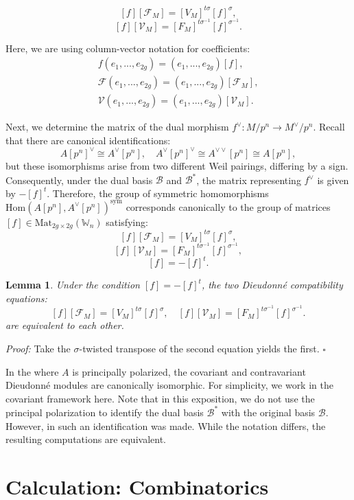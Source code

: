 \documentclass[a4paper,12pt,twoside]{report}
\newtheorem{lemma}[theorem]{Lemma}
\newcommand{\Hom}{\mathrm{Hom}}
\newcommand{\W}{\mathbb{W}}
\newcommand{\sym}{\mathrm{sym}}
\begin{document}
\[[f][\mathcal{F}_M]=[V_M]^{t\sigma}[f]^\sigma,\]
\[[f][\mathcal{V}_M]=[F_M]^{t\sigma^{-1}}[f]^{\sigma^{-1}}.\]

Here, we are using column-vector notation for coefficients: 
\[\begin{aligned}
    f(e_1,...,e_{2g})=(e_1,...,e_{2g})[f],\\
    \mathcal{F}(e_1,...,e_{2g})=(e_1,...,e_{2g})[\mathcal{F}_M],\\
    \mathcal{V}(e_1,...,e_{2g})=(e_1,...,e_{2g})[\mathcal{V}_M].
\end{aligned}\]

Next, we determine the matrix of the dual morphism $f^{\vee}: M/p^n\rightarrow M^{\vee}/p^n$. 
Recall that there are canonical identifications: 
\[A[p^n]^{\vee}\cong A^\vee[p^n],\quad A^\vee[p^n]^\vee\cong A^{\vee\vee}[p^n]\cong A[p^n],\]
but these isomorphisms arise from two different Weil pairings, differing by a sign. 
Consequently, under the dual basis $\mathcal{B}$ and $\mathcal{B}^*$, 
the matrix representing $f^\vee$ is given by $-[f]^t$. 
Therefore, the group of symmetric homomorphisms $\Hom(A[p^n],A^{\vee}[p^n])^{\sym}$ corresponds canonically to
the group of matrices $[f]\in \mathrm{Mat}_{2g\times 2g}(\W_{n})$ satisfying:  
\[[f][\mathcal{F}_M]=[V_M]^{t\sigma}[f]^\sigma,\]
\[[f][\mathcal{V}_M]=[F_M]^{t\sigma^{-1}}[f]^{\sigma^{-1}},\]
\[[f]=-[f]^t.\]

\begin{lemma}
    Under the condition $[f]=-[f]^t$, the two Dieudonné compatibility equations: 
\[[f][\mathcal{F}_M]=[V_M]^{t\sigma}[f]^\sigma,\quad [f][\mathcal{V}_M]=[F_M]^{t\sigma^{-1}}[f]^{\sigma^{-1}}.\]
    are equivalent to each other. 
\end{lemma}

\noindent\emph{Proof:} Take the $\sigma$-twisted transpose of the second equation yields the first. $\square$

In the where $A$ is principally polarized, the covariant and contravariant Dieudonné modules are canonically isomorphic.
For simplicity, we work in the covariant framework here. 
Note that in this exposition, we do not use the principal polarization to identify the dual basis 
$\mathcal{B}^*$ with the original basis $\mathcal{B}$. 
However, in \cite{Skor}such an identification was made.
While the notation differs, the resulting computations are equivalent.

\section{Calculation: Combinatorics}
\end{document}
